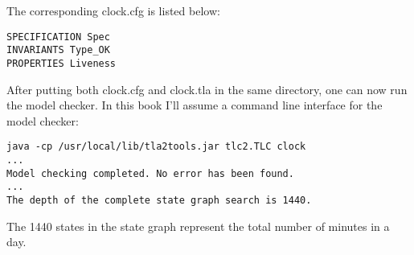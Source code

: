 The corresponding clock.cfg is listed below: 
\begin{framed}
\begin{verbatim}
SPECIFICATION Spec
INVARIANTS Type_OK
PROPERTIES Liveness
\end{verbatim}
\end{framed}

After putting both clock.cfg and clock.tla in the same directory, one can now
run the model checker. In this book I'll assume a command line interface for the
model checker:
\begin{verbatim}
java -cp /usr/local/lib/tla2tools.jar tlc2.TLC clock
...
Model checking completed. No error has been found.
...
The depth of the complete state graph search is 1440.
\end{verbatim}
The 1440 states in the state graph represent the total number of minutes in a day.

